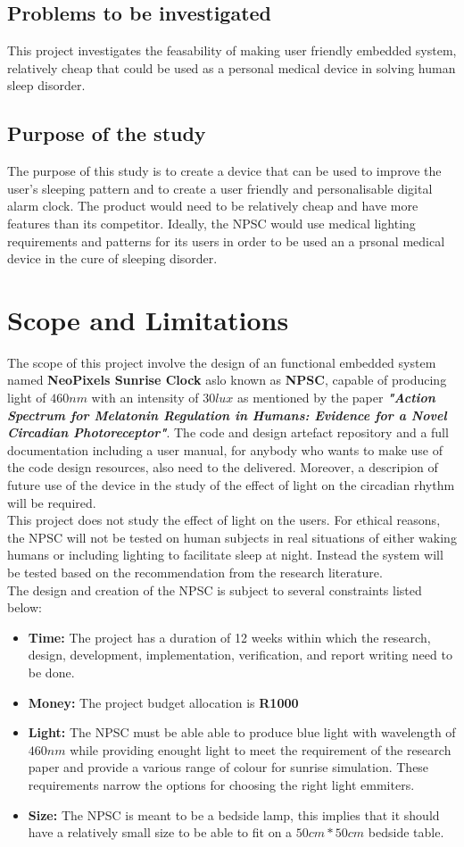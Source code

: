 \subsection{Problems to be investigated}
This project investigates the feasability of making user friendly embedded system, relatively cheap that could be used as a personal medical device in solving human sleep disorder.
\subsection{Purpose of the study}
The purpose of this study is to create a device that can be used to improve the user's sleeping pattern and to create a user friendly and personalisable digital alarm clock. The product would need to be relatively cheap and have more features than its competitor. Ideally, the NPSC would use medical lighting requirements and patterns for its users in order to be used an a prsonal medical device in the cure of sleeping disorder.  

\section{Scope and Limitations}
The scope of this project involve the design of an functional embedded system named \textbf{NeoPixels Sunrise Clock} aslo known as \textbf{NPSC}, capable of producing light of $460nm$ with an intensity of $30 lux$ as mentioned by the paper \textit{\textbf{"Action Spectrum for Melatonin Regulation in Humans: Evidence for a Novel Circadian Photoreceptor"}}. The code and design artefact repository and a full documentation including a user manual, for anybody who wants to make use of the code design resources, also need to the delivered. Moreover, a descripion of future use of the device in the study of the effect of light on the circadian rhythm will be required.\\
This project does not study the effect of light on the users. For ethical reasons, the NPSC will not be tested  on human subjects in real situations of either waking humans or including lighting to facilitate sleep at night. Instead the system will be tested based on the recommendation from the research  literature.\\
The design and creation of the NPSC is subject to several constraints listed below:
\begin{itemize}
\item \textbf{Time:} The project has a duration of 12 weeks within which the research, design, development, implementation, verification, and report writing need to be done.
\item \textbf{Money:} The project budget allocation is \textbf{R1000}
\item \textbf{Light:} The NPSC must be able able to produce blue light with wavelength of $460nm$ while providing enought light to meet the requirement of the research paper and provide a various range of colour for sunrise simulation. These requirements narrow the options for choosing the right light emmiters.
\item \textbf{Size:} The NPSC is meant to be a bedside lamp, this implies that it should have a relatively small size to be able to fit on a $50cm*50cm$ bedside table.
\end{itemize}
